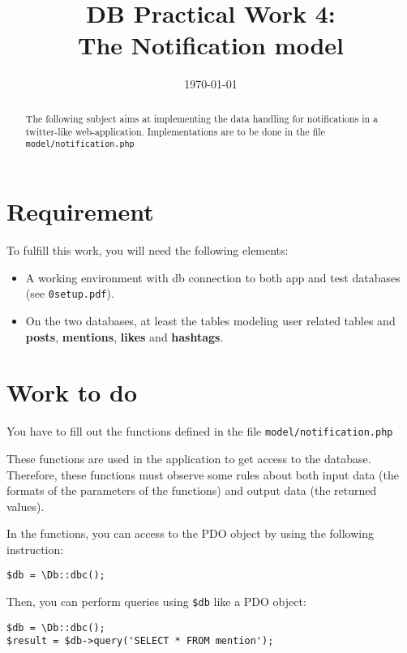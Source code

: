 \documentclass[twoside,a4paper,12pt]{article}
\title{DB Practical Work 4:\\The Notification model}
\date{\today}
\begin{document}
\maketitle

\begin{abstract}
  The following subject aims at implementing the data handling for notifications in a twitter-like web-application. Implementations are to be done in the file \texttt{model/notification.php}
\end{abstract}

\tableofcontents

\clearpage

\section{Requirement}
To fulfill this work, you will need the following elements:

\begin{itemize}
\item A working environment with db connection to both app and test databases (see \texttt{0setup.pdf}).
\item On the two databases, at least the tables modeling user related tables and \textbf{posts}, \textbf{mentions}, \textbf{likes} and \textbf{hashtags}.
\end{itemize}

\section{Work to do}
You have to fill out the functions defined in the file \texttt{model/notification.php}

These functions are used in the application to get access to the database. Therefore, these functions must observe some rules about both input data (the formats of the parameters of the functions) and output data (the returned values).

In the functions, you can access to the PDO object by using the following instruction:

\begin{lstlisting}
$db = \Db::dbc();
\end{lstlisting}

Then, you can perform queries using \texttt{\$db} like a PDO object:
\begin{lstlisting}
$db = \Db::dbc();
$result = $db->query('SELECT * FROM mention');
\end{lstlisting}
\end{document}
